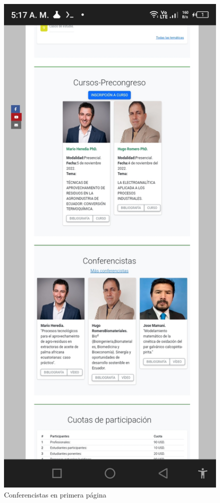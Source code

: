 \documentclass[a4paper,14px]{article}
\begin{document}
\begin{minipage}[H]{0.45\linewidth}
\begin{figure}[H]
  \centering
  \includegraphics[scale=0.3]{index3.jpg}
  \caption{ Conferencistas en primera página }
  \label{fig:arquitectura1}
\end{figure}
  
\end{minipage}
\end{document}
